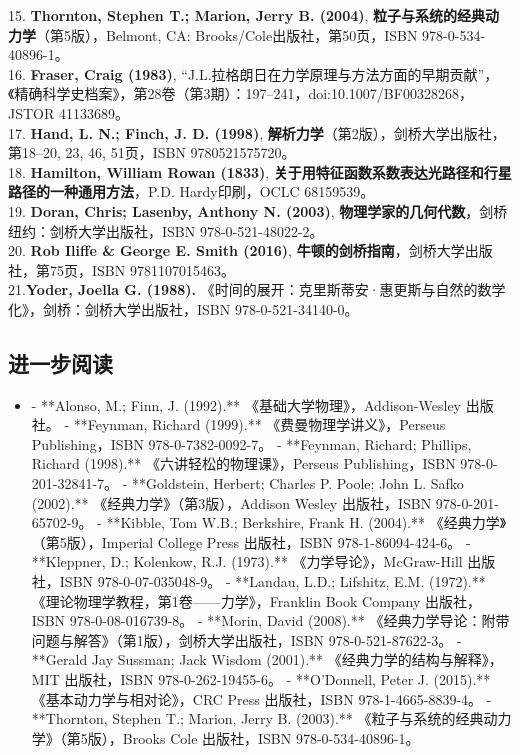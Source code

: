 15. \textbf{Thornton, Stephen T.; Marion, Jerry B. (2004)}, \textbf{粒子与系统的经典动力学}（第5版），Belmont, CA: Brooks/Cole出版社，第50页，ISBN 978-0-534-40896-1。\\
16. \textbf{Fraser, Craig (1983)}, “J.L.拉格朗日在力学原理与方法方面的早期贡献”，《精确科学史档案》，第28卷（第3期）：197–241，doi:10.1007/BF00328268，JSTOR 41133689。\\
17. \textbf{Hand, L. N.; Finch, J. D. (1998)}, \textbf{解析力学}（第2版），剑桥大学出版社，第18–20, 23, 46, 51页，ISBN 9780521575720。\\
18. \textbf{Hamilton, William Rowan (1833)}, \textbf{关于用特征函数系数表达光路径和行星路径的一种通用方法}，P.D. Hardy印刷，OCLC 68159539。\\
19. \textbf{Doran, Chris; Lasenby, Anthony N. (2003)}, \textbf{物理学家的几何代数}，剑桥纽约：剑桥大学出版社，ISBN 978-0-521-48022-2。\\
20. \textbf{Rob Iliffe & George E. Smith (2016)}, \textbf{牛顿的剑桥指南}，剑桥大学出版社，第75页，ISBN 9781107015463。\\
21.\textbf{Yoder, Joella G. (1988). }《时间的展开：克里斯蒂安·惠更斯与自然的数学化》，剑桥：剑桥大学出版社，ISBN 978-0-521-34140-0。
\subsection{进一步阅读}

\begin{itemize}
\item - **Alonso, M.; Finn, J. (1992).** 《基础大学物理》，Addison-Wesley 出版社。
- **Feynman, Richard (1999).** 《费曼物理学讲义》，Perseus Publishing，ISBN 978-0-7382-0092-7。
- **Feynman, Richard; Phillips, Richard (1998).** 《六讲轻松的物理课》，Perseus Publishing，ISBN 978-0-201-32841-7。
- **Goldstein, Herbert; Charles P. Poole; John L. Safko (2002).** 《经典力学》（第3版），Addison Wesley 出版社，ISBN 978-0-201-65702-9。
- **Kibble, Tom W.B.; Berkshire, Frank H. (2004).** 《经典力学》（第5版），Imperial College Press 出版社，ISBN 978-1-86094-424-6。
- **Kleppner, D.; Kolenkow, R.J. (1973).** 《力学导论》，McGraw-Hill 出版社，ISBN 978-0-07-035048-9。
- **Landau, L.D.; Lifshitz, E.M. (1972).** 《理论物理学教程，第1卷——力学》，Franklin Book Company 出版社，ISBN 978-0-08-016739-8。
- **Morin, David (2008).** 《经典力学导论：附带问题与解答》（第1版），剑桥大学出版社，ISBN 978-0-521-87622-3。
- **Gerald Jay Sussman; Jack Wisdom (2001).** 《经典力学的结构与解释》，MIT 出版社，ISBN 978-0-262-19455-6。
- **O'Donnell, Peter J. (2015).** 《基本动力学与相对论》，CRC Press 出版社，ISBN 978-1-4665-8839-4。
- **Thornton, Stephen T.; Marion, Jerry B. (2003).** 《粒子与系统的经典动力学》（第5版），Brooks Cole 出版社，ISBN 978-0-534-40896-1。
\end{itemize}